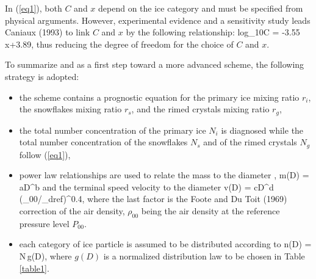 In (\ref{eq1}), both $C$ and $x$ depend on the ice category
and must be specified from physical arguments. However, experimental evidence
and a sensitivity study leads Caniaux (1993) to link $C$ and $x$ by the
following relationship:
%
\be\label{eq2}
{\rm log_{10}}C = -3.55\,x+3.89,
\ee
%
\noindent thus reducing the degree of freedom for the choice of $C$ and $x$.

\medskip
\medskip
\noindent To summarize and as a first step toward a more advanced scheme, the
following strategy is adopted:
\begin{itemize}
\item the scheme contains a prognostic equation for the primary ice mixing ratio
$r_i$, the snowflakes mixing ratio $r_s$, and the rimed crystals mixing ratio
$r_g$,
\item the total number concentration of the primary ice $N_i$ is diagnosed
while the total number concentration of the snowflakes $N_s$ and of the rimed
crystals $N_g$ follow (\ref{eq1}),
\item power law relationships are used to relate the mass to the diameter\footnotemark
{},
%
\be\label{eq3}
m(D) = aD^b
\ee
%
\noindent and the terminal speed velocity to the diameter
%
\be\label{eq4}
v(D) = cD^d \, (\rho_{00}/\rho_{dref})^{0.4},
\ee
%
\noindent where the last factor is the Foote and Du Toit (1969) correction of
the air density, $\rho_{00}$ being the air density at the reference pressure
level $P_{00}$.
\item each category of ice particle is assumed to be distributed according to
%
\be\label{eq5}
n(D) = N\,g(D),
\ee
%
\noindent where $g(D)$ is a normalized distribution law to be chosen in
Table \ref{table1}.


\end{itemize}
